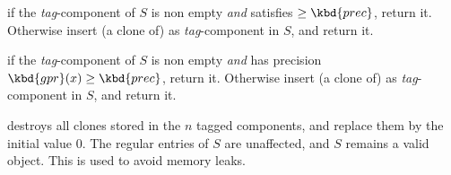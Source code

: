  if the \emph{tag}-component of $S$ is non empty \emph{and}
satisfies  $\geq \kbd{prec}$, return it. Otherwise insert (a
clone of)  as \emph{tag}-component in $S$, and return it.

 if the \emph{tag}-component of $S$ is non empty
\emph{and} has precision $\kbd{gpr}(x)\geq \kbd{prec}$, return it. Otherwise
insert (a clone of)  as \emph{tag}-component in $S$,
and return it.

 destroys all clones stored in the $n$ tagged
components, and replace them by the initial value $0$. The regular entries of
$S$ are unaffected, and $S$ remains a valid object. This is used to
avoid memory leaks.
